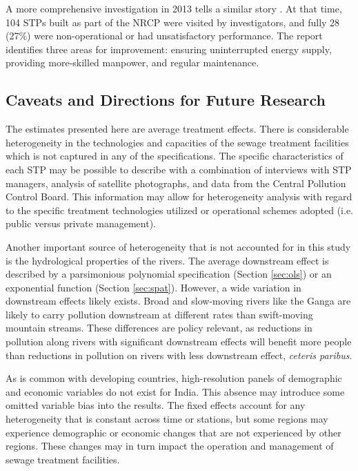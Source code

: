 \documentclass[12pt]{article}
\begin{document}
A more comprehensive investigation in 2013 tells a similar story \citep{nrcd2013}. At that time, 104 STPs built as part of the NRCP were visited by investigators, and fully 28 (27\%) were non-operational or had unsatisfactory performance. The report identifies three areas for improvement: ensuring uninterrupted energy supply, providing more-skilled manpower, and regular maintenance. 

\subsection{Caveats and Directions for Future Research}

The estimates presented here are average treatment effects. There is considerable heterogeneity in the technologies and capacities of the sewage treatment facilities which is not captured in any of the specifications. The specific characteristics of each STP may be possible to describe with a combination of interviews with STP managers, analysis of satellite photographs, and data from the Central Pollution Control Board. This information may allow for heterogeneity analysis with regard to the specific treatment technologies utilized or operational schemes adopted (i.e. public versus private management).

Another important source of heterogeneity that is not accounted for in this study is the hydrological properties of the rivers. The average downstream effect is described by a parsimonious polynomial specification (Section \ref{sec:ols}) or an exponential function (Section \ref{sec:spat}). However, a wide variation in downstream effects likely exists. Broad and slow-moving rivers like the Ganga are likely to carry pollution downstream at different rates than swift-moving mountain streams. These differences are policy relevant, as reductions in pollution along rivers with significant downstream effects will benefit more people than reductions in pollution on rivers with less downstream effect, \textit{ceteris paribus}.

As is common with developing countries, high-resolution panels of demographic and economic variables do not exist for India. This absence may introduce some omitted variable bias into the results. The fixed effects account for any heterogeneity that is constant across time or stations, but some regions may experience demographic or economic changes that are not experienced by other regions. These changes may in turn impact the operation and management of sewage treatment facilities. 
\end{document}
